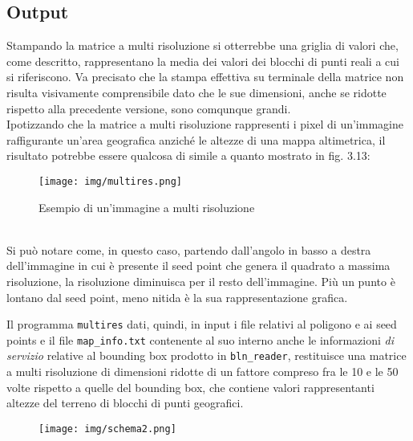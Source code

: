 		\subsection{Output}
			Stampando la matrice a multi risoluzione si otterrebbe una griglia di valori che, come descritto, rappresentano la media dei valori dei blocchi di punti reali a cui si riferiscono. Va precisato che la stampa effettiva su terminale della matrice non risulta visivamente comprensibile dato che le sue dimensioni, anche se ridotte rispetto alla precedente versione, sono comqunque grandi.\\
			Ipotizzando che la matrice a multi risoluzione rappresenti i pixel di un'immagine raffigurante un'area geografica anzich\'{e} le altezze di una mappa altimetrica, il risultato potrebbe essere qualcosa di simile a quanto mostrato in fig. 3.13:
			\begin{figure}[htbp]
				\centering
				\texttt{[image: img/multires.png]}
				\caption{Esempio di un'immagine a multi risoluzione}
			\end{figure}\\
			Si pu\`{o} notare come, in questo caso, partendo dall'angolo in basso a destra dell'immagine in cui \`{e} presente il seed point che genera il quadrato a massima risoluzione, la risoluzione diminuisca per il resto dell'immagine. Pi\`{u} un punto \`{e} lontano dal seed point, meno nitida \`{e} la sua rappresentazione grafica.

			Il programma \texttt{multires} dati, quindi, in input i file relativi al poligono e ai seed points e il file \texttt{map\_info.txt} contenente al suo interno anche le informazioni \textit{di servizio} relative al bounding box prodotto in \texttt{bln\_reader}, restituisce una matrice a multi risoluzione di dimensioni ridotte di un fattore compreso fra le 10 e le 50 volte rispetto a quelle del bounding box, che contiene valori rappresentanti altezze del terreno di blocchi di punti geografici.
			\begin{figure}[htbp]
				\centering
				\texttt{[image: img/schema2.png]}
			\end{figure}